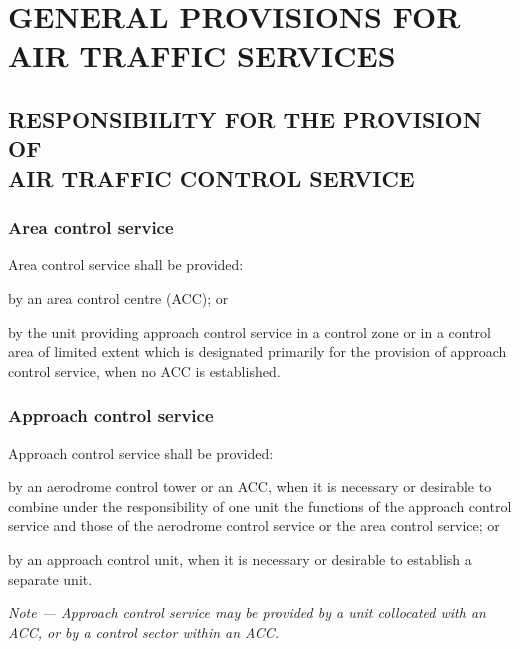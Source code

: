 \documentclass[../main.tex]{subfiles}
\begin{document}
    \thispagestyle{1page}
    
    \section[General Provisions for Air Traffic Services]{GENERAL PROVISIONS FOR AIR TRAFFIC SERVICES} \label{4}

    \subsection[Responsibility for the provision of air traffic control service]{RESPONSIBILITY FOR THE PROVISION OF \\ AIR TRAFFIC CONTROL SERVICE}
   
    \subsubsection{Area control service}
    
    Area control service shall be provided:
    \begin{enumalph}
        \item by an area control centre (ACC); or
        \item by the unit providing approach control service in a control zone or in a control area of limited extent which is designated primarily for the provision of approach control service, when no ACC is established.
    \end{enumalph}

    \subsubsection{Approach control service}

    Approach control service shall be provided:
    \begin{enumalph}
        \item by an aerodrome control tower or an ACC, when it is necessary or desirable to combine under the responsibility of one unit the functions of the approach control service and those of the aerodrome control service or the area control service; or
        \item by an approach control unit, when it is necessary or desirable to establish a separate unit.
    \end{enumalph}

    \textit{Note --- Approach control service may be provided by a unit collocated with an ACC, or by a control sector within an ACC.}
\end{document}

